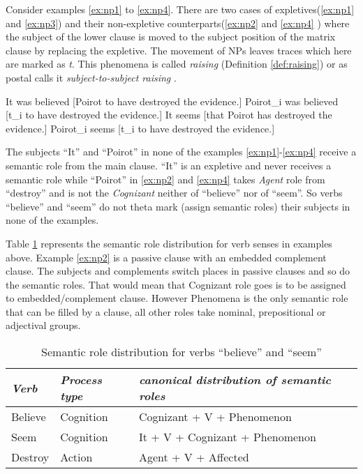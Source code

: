 Consider examples \ref{ex:np1} to \ref{ex:np4}. There are two cases of expletives(\ref{ex:np1} and \ref{ex:np3}) and their non-expletive counterparts(\ref{ex:np2} and \ref{ex:np4} ) where the subject of the lower clause is moved to the subject position of the matrix clause by replacing the expletive. The movement of NPs leaves traces which here are marked as \textit{t}. This phenomena is called \textit{raising} (Definition \ref{def:raising}) or as postal calls it \textit{subject-to-subject raising} \cite{Postal1974}.

\begin{exe}
	\ex\label{ex:np1} It was believed [Poirot to have destroyed the evidence.]
	\ex\label{ex:np2} Poirot_{i} was believed [t_{i} to have destroyed the evidence.]
	\ex\label{ex:np3} It seems [that Poirot has destroyed the evidence.]
	\ex\label{ex:np4} Poirot_{i} seems [t_{i} to have destroyed the evidence.]
\end{exe}

The subjects ``It'' and ``Poirot'' in none of the examples \ref{ex:np1}-\ref{ex:np4} receive a semantic role from the main clause. ``It'' is an expletive and never receives a semantic role while ``Poirot'' in \ref{ex:np2} and \ref{ex:np4} takes \textit{Agent} role from ``destroy'' and is not the \textit{Cognizant} neither of ``believe'' nor of ``seem''. So verbs ``believe'' and ``seem'' do not theta mark (assign semantic roles) their subjects in none of the examples.

Table \ref{tab:srl-for-example} represents the semantic role distribution for verb senses in examples above. Example \ref{ex:np2} is a passive clause with an embedded complement clause. The subjects and complements switch places in passive clauses and so do the semantic roles. That would mean that Cognizant role goes is to be assigned to embedded/complement clause. However Phenomena is the only semantic role that can be filled by a clause, all other roles take nominal, prepositional or adjectival groups.

\begin{table}[h]
	\centering
	\begin{tabular}{|l|l|l|}
		\hline
		\textit{Verb} & \textit{Process type} & \textit{canonical distribution of semantic roles} \\ \hline
		Believe & Cognition & Cognizant + V + Phenomenon \\ \hline
		Seem & Cognition & It + V + Cognizant + Phenomenon \\ \hline
		Destroy & Action & Agent + V + Affected \\ \hline
	\end{tabular}
	\caption{Semantic role distribution for verbs ``believe'' and ``seem''}
	\label{tab:srl-for-example}
\end{table}

